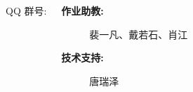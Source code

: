 \begin{frame}{}
  \begin{columns}
      \begin{center}
        QQ 群号: 

      \end{center}
      \begin{description}
        \item[\bf 作业助教:] 裴一凡、戴若石、肖江 \\[15pt]
        \item[\bf 技术支持:] 唐瑞泽
      \end{description}
  \end{columns}
\end{frame}

\begin{frame}{}
  \begin{columns}
  \end{columns}

  \vspace{0.50cm}
  \begin{center}
  \end{center}
\end{frame}
